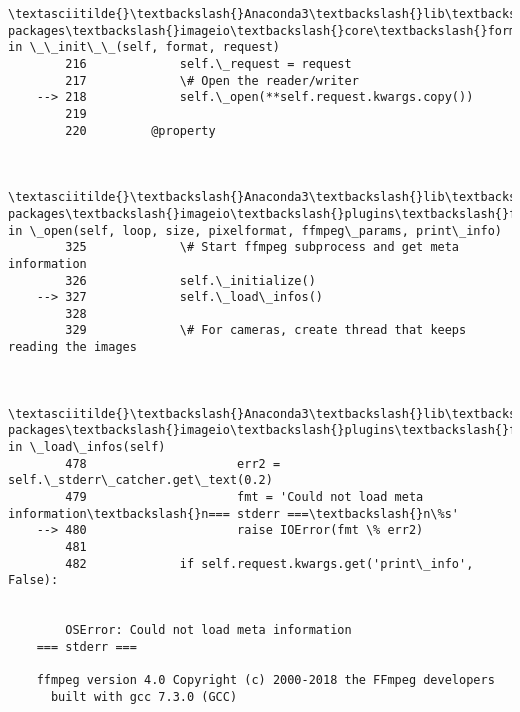 \documentclass[11pt]{article}
\begin{document}
\begin{Verbatim}[commandchars=\\\{\}]
        \textasciitilde{}\textbackslash{}Anaconda3\textbackslash{}lib\textbackslash{}site-packages\textbackslash{}imageio\textbackslash{}core\textbackslash{}format.py in \_\_init\_\_(self, format, request)
        216             self.\_request = request
        217             \# Open the reader/writer
    --> 218             self.\_open(**self.request.kwargs.copy())
        219 
        220         @property
    

        \textasciitilde{}\textbackslash{}Anaconda3\textbackslash{}lib\textbackslash{}site-packages\textbackslash{}imageio\textbackslash{}plugins\textbackslash{}ffmpeg.py in \_open(self, loop, size, pixelformat, ffmpeg\_params, print\_info)
        325             \# Start ffmpeg subprocess and get meta information
        326             self.\_initialize()
    --> 327             self.\_load\_infos()
        328 
        329             \# For cameras, create thread that keeps reading the images
    

        \textasciitilde{}\textbackslash{}Anaconda3\textbackslash{}lib\textbackslash{}site-packages\textbackslash{}imageio\textbackslash{}plugins\textbackslash{}ffmpeg.py in \_load\_infos(self)
        478                     err2 = self.\_stderr\_catcher.get\_text(0.2)
        479                     fmt = 'Could not load meta information\textbackslash{}n=== stderr ===\textbackslash{}n\%s'
    --> 480                     raise IOError(fmt \% err2)
        481 
        482             if self.request.kwargs.get('print\_info', False):
    

        OSError: Could not load meta information
    === stderr ===
    
    ffmpeg version 4.0 Copyright (c) 2000-2018 the FFmpeg developers
      built with gcc 7.3.0 (GCC)

    \end{Verbatim}


    
    
    
    
\end{document}
